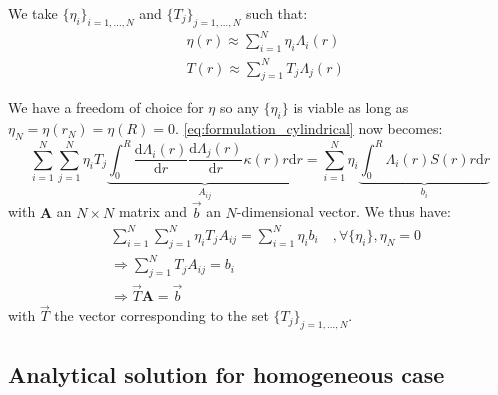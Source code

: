 We take $\{\eta_i\}_{i=1,\ldots,N}$ and $\{T_j\}_{j=1,\ldots,N}$ such that:
\begin{equation}
    \begin{aligned}
        & \eta(r) \approx \sum_{i=1}^N \eta_i \Lambda_i(r) \\
        & T(r) \approx \sum_{j=1}^N T_j \Lambda_j(r)
    \end{aligned}
\end{equation}

We have a freedom of choice for $\eta$ so any $\{\eta_i\}$ is viable as long as $\eta_N = \eta(r_N) = \eta(R) = 0$.
\autoref{eq:formulation_cylindrical} now becomes:
\begin{equation}
    \sum_{i=1}^{N} \sum_{j=1}^{N} \eta_i T_j \underbrace{\int_0^R \frac{\mathrm{d} \Lambda_i(r)}{\mathrm{d} r} \frac{\mathrm{d} \Lambda_j(r)}{\mathrm{d} r} \kappa(r)  r \mathrm{d}r}_{A_{ij}}  = \sum_{i=1}^{N} \eta_i \underbrace{\int_0^R \Lambda_i(r) S(r) r \mathrm{d}r}_{b_i}
\end{equation}
with $\mathbf{A}$ an $N\times N$ matrix and $\vec{b}$ an $N$-dimensional vector. We thus have:
\begin{equation}
    \begin{aligned}
        & \sum_{i=1}^{N} \sum_{j=1}^{N} \eta_i T_j A_{ij}  = \sum_{i=1}^{N} \eta_i b_i \quad , \forall \{\eta_i\}, \eta_N = 0 \\
        & \Rightarrow \sum_{j=1}^{N} T_j A_{ij} = b_i \\
        & \Rightarrow \vec{T} \mathbf{A} = \vec{b}
    \end{aligned}
\end{equation}
with $\vec{T}$ the vector corresponding to the set $\{T_j\}_{j=1,\ldots,N}$.

\subsection{Analytical solution for homogeneous case}
\label{sec:solution_anal}

